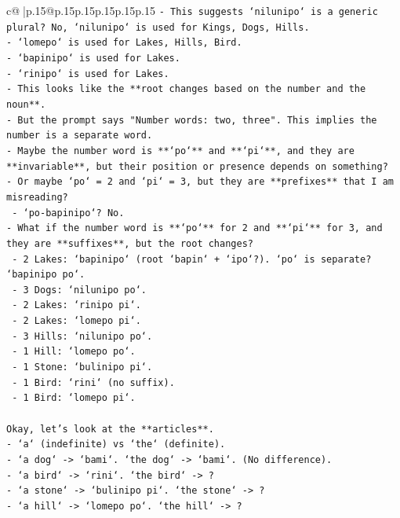 \documentclass{article}
\begin{document}
{\begin{supertabular}{c@{$\;$}|p{.15\linewidth}@{}p{.15\linewidth}p{.15\linewidth}p{.15\linewidth}p{.15\linewidth}p{.15\linewidth}}
{{{\texttt{{-} This suggests `nilunipo` is a generic plural? No, `nilunipo` is used for Kings, Dogs, Hills.} \\
\texttt{{-} `lomepo` is used for Lakes, Hills, Bird.} \\
\texttt{{-} `bapinipo` is used for Lakes.} \\
\texttt{{-} `rinipo` is used for Lakes.} \\
\texttt{{-} This looks like the **root changes based on the number and the noun**.} \\
\texttt{{-} But the prompt says "Number words: two, three". This implies the number is a separate word.} \\
\texttt{{-} Maybe the number word is **`po`** and **`pi`**, and they are **invariable**, but their position or presence depends on something?} \\
\texttt{{-} Or maybe `po` = 2 and `pi` = 3, but they are **prefixes** that I am misreading?} \\
\texttt{  {-} `po{-}bapinipo`? No.} \\
\texttt{{-} What if the number word is **`po`** for 2 and **`pi`** for 3, and they are **suffixes**, but the root changes?} \\
\texttt{  {-} 2 Lakes: `bapinipo` (root `bapin` + `ipo`?). `po` is separate? `bapinipo po`.} \\
\texttt{  {-} 3 Dogs: `nilunipo po`.} \\
\texttt{  {-} 2 Lakes: `rinipo pi`.} \\
\texttt{  {-} 2 Lakes: `lomepo pi`.} \\
\texttt{  {-} 3 Hills: `nilunipo po`.} \\
\texttt{  {-} 1 Hill: `lomepo po`.} \\
\texttt{  {-} 1 Stone: `bulinipo pi`.} \\
\texttt{  {-} 1 Bird: `rini` (no suffix).} \\
\texttt{  {-} 1 Bird: `lomepo pi`.} \\
\\ 
\texttt{Okay, let's look at the **articles**.} \\
\texttt{{-} `a` (indefinite) vs `the` (definite).} \\
\texttt{{-} `a dog` {-}> `bami`. `the dog` {-}> `bami`. (No difference).} \\
\texttt{{-} `a bird` {-}> `rini`. `the bird` {-}> ?} \\
\texttt{{-} `a stone` {-}> `bulinipo pi`. `the stone` {-}> ?} \\
\texttt{{-} `a hill` {-}> `lomepo po`. `the hill` {-}> ?} \\
}}}
\end{supertabular}}
\end{document}
